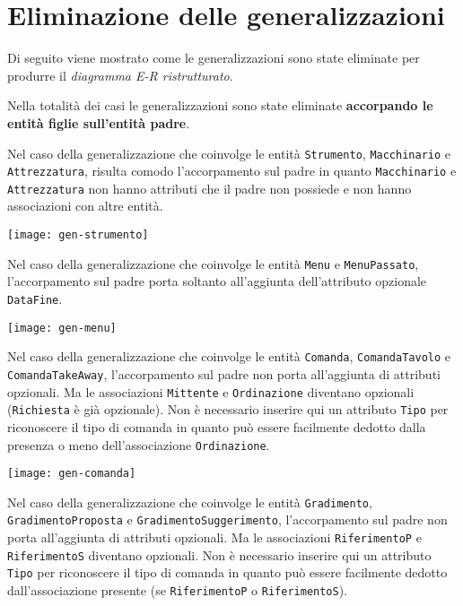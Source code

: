 \section{Eliminazione delle generalizzazioni}
Di seguito viene mostrato come le generalizzazioni sono state eliminate per produrre
il {\it diagramma E-R ristrutturato}.

Nella totalità dei casi le generalizzazioni sono state eliminate {\bf accorpando
le entità figlie sull'entità padre}.

\vspace{15pt}

Nel caso della generalizzazione che coinvolge le entità {\tt Strumento}, {\tt Macchinario}
e {\tt Attrezzatura}, risulta comodo l'accorpamento sul padre in quanto {\tt Macchinario}
e {\tt Attrezzatura} non hanno attributi che il padre non possiede e non hanno
associazioni con altre entità.

\vspace{5pt}\centerline{\texttt{[image: gen-strumento]}}

\vspace{15pt}

Nel caso della generalizzazione che coinvolge le entità {\tt Menu} e  {\tt MenuPassato},
l'accorpamento sul padre porta soltanto all'aggiunta dell'attributo opzionale
{\tt DataFine}.

\vspace{5pt}\centerline{\texttt{[image: gen-menu]}}

\vspace{15pt}

Nel caso della generalizzazione che coinvolge le entità {\tt Comanda}, {\tt ComandaTavolo}
e {\tt ComandaTakeAway}, l'accorpamento sul padre non porta all'aggiunta di attributi opzionali.
Ma le associazioni {\tt Mittente} e {\tt Ordinazione} diventano opzionali ({\tt Richiesta} è
già opzionale). Non è necessario inserire qui un attributo {\tt Tipo} per riconoscere
il tipo di comanda in quanto può essere facilmente dedotto dalla presenza o meno
dell'associazione {\tt Ordinazione}.

\vspace{5pt}\centerline{\texttt{[image: gen-comanda]}}

\vspace{15pt}

Nel caso della generalizzazione che coinvolge le entità {\tt Gradimento}, {\tt GradimentoProposta}
e {\tt GradimentoSuggerimento}, l'accorpamento sul padre non porta all'aggiunta di attributi opzionali.
Ma le associazioni {\tt RiferimentoP} e {\tt RiferimentoS} diventano opzionali.
Non è necessario inserire qui un attributo {\tt Tipo} per riconoscere il tipo di
comanda in quanto può essere facilmente dedotto dall'associazione presente (se
{\tt RiferimentoP} o {\tt RiferimentoS}).

